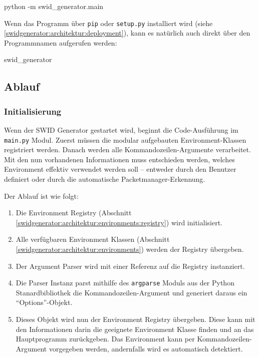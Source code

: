 \begin{bashcode}
python -m swid_generator.main
\end{bashcode}

Wenn das Programm über \texttt{pip} oder \texttt{setup.py} installiert wird (siehe
\autoref{swidgenerator:architektur:deployment}), kann es natürlich auch direkt
über den Programmnamen aufgerufen werden:

\begin{bashcode}
swid_generator
\end{bashcode}

\subsection{Ablauf}

\subsubsection{Initialisierung}
\label{swidgenerator:architektur:initialisierung}

Wenn der SWID Generator gestartet wird, beginnt die Code-Ausführung im
\texttt{main.py} Modul. Zuerst müssen die modular aufgebauten
Environment-Klassen registriert werden. Danach werden alle
Kommandozeilen-Argumente verarbeitet. Mit den nun vorhandenen Informationen muss
entschieden werden, welches Environment effektiv verwendet werden soll --
entweder durch den Benutzer definiert oder durch die automatische
Packetmanager-Erkennung.

Der Ablauf ist wie folgt:

\begin{enumerate}
	\item Die Environment Registry
		(Abschnitt \ref{swidgenerator:architektur:environments:registry}) wird initialisiert.
	\item Alle verfügbaren Environment Klassen
		(Abschnitt \ref{swidgenerator:architektur:environments}) werden der Registry
		übergeben.
	\item Der Argument Parser wird mit einer Referenz auf die Registry instanziert.
	\item Die Parser Instanz parst mithilfe des \texttt{argparse} Moduls aus der
		Python Stanardbibliothek die Kommandozeilen-Argument und generiert daraus ein
		\enquote{Options}-Objekt. \item Dieses Objekt wird nun der Environment Registry
		übergeben. Diese kann mit den Informationen darin die geeignete Environment
		Klasse finden und an das Hauptprogramm zurückgeben. Das Environment kann per
		Kommandozeilen-Argument vorgegeben werden, andernfalls wird es automatisch
		detektiert.
\end{enumerate}

